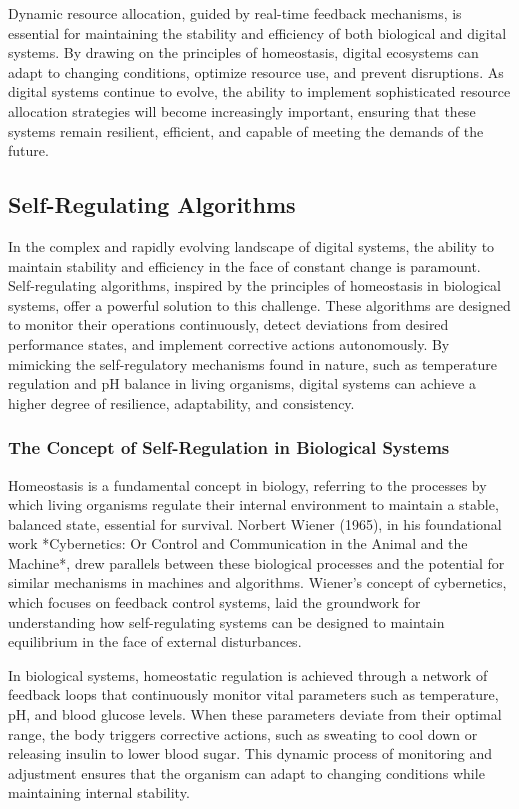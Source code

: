\documentclass[12pt,twoside]{article}
\begin{document}
Dynamic resource allocation, guided by real-time feedback mechanisms, is essential for maintaining the stability and efficiency of both biological and digital systems. By drawing on the principles of homeostasis, digital ecosystems can adapt to changing conditions, optimize resource use, and prevent disruptions. As digital systems continue to evolve, the ability to implement sophisticated resource allocation strategies will become increasingly important, ensuring that these systems remain resilient, efficient, and capable of meeting the demands of the future.

\subsection{Self-Regulating Algorithms}

In the complex and rapidly evolving landscape of digital systems, the ability to maintain stability and efficiency in the face of constant change is paramount. Self-regulating algorithms, inspired by the principles of homeostasis in biological systems, offer a powerful solution to this challenge. These algorithms are designed to monitor their operations continuously, detect deviations from desired performance states, and implement corrective actions autonomously. By mimicking the self-regulatory mechanisms found in nature, such as temperature regulation and pH balance in living organisms, digital systems can achieve a higher degree of resilience, adaptability, and consistency.

\subsubsection{The Concept of Self-Regulation in Biological Systems}

Homeostasis is a fundamental concept in biology, referring to the processes by which living organisms regulate their internal environment to maintain a stable, balanced state, essential for survival. Norbert Wiener (1965), in his foundational work *Cybernetics: Or Control and Communication in the Animal and the Machine*, drew parallels between these biological processes and the potential for similar mechanisms in machines and algorithms. Wiener’s concept of cybernetics, which focuses on feedback control systems, laid the groundwork for understanding how self-regulating systems can be designed to maintain equilibrium in the face of external disturbances.

In biological systems, homeostatic regulation is achieved through a network of feedback loops that continuously monitor vital parameters such as temperature, pH, and blood glucose levels. When these parameters deviate from their optimal range, the body triggers corrective actions, such as sweating to cool down or releasing insulin to lower blood sugar. This dynamic process of monitoring and adjustment ensures that the organism can adapt to changing conditions while maintaining internal stability.
\end{document}
